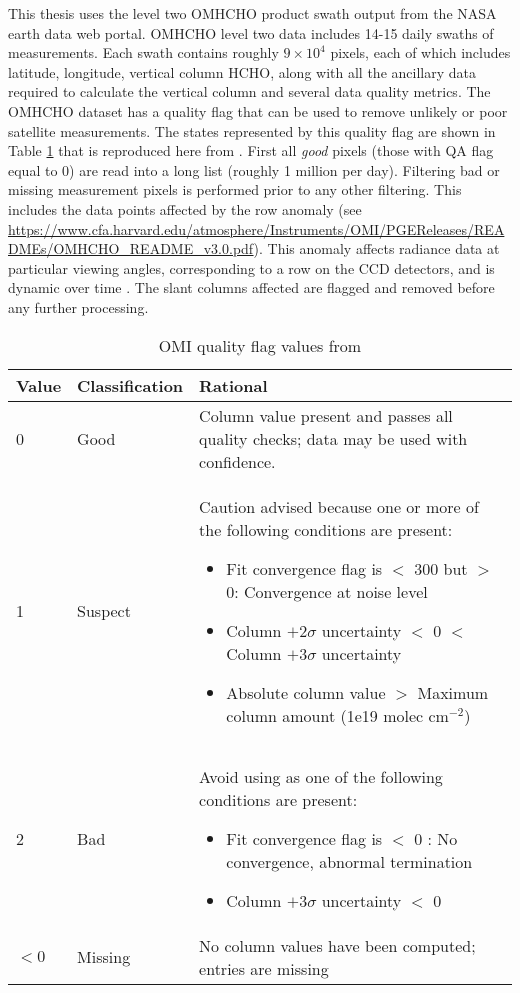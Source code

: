     This thesis uses the level two OMHCHO product swath output from the NASA earth data web portal.
    OMHCHO level two data includes 14-15 daily swaths of measurements.
    Each swath contains roughly $9 \times 10^4$ pixels, each of which includes latitude, longitude, vertical column HCHO, along with all the ancillary data required to calculate the vertical column and several data quality metrics.
    The OMHCHO dataset has a quality flag that can be used to remove unlikely or poor satellite measurements.
    The states represented by this quality flag are shown in Table \ref{Model:datasets:OMHCHO:tab_qflag} that is reproduced here from \textcite{Kurosu2014}.
    First all \textit{good} pixels (those with QA flag equal to 0) are read into a long list (roughly 1 million per day).
    Filtering bad or missing measurement pixels is performed prior to any other filtering.
    This includes the data points affected by the row anomaly (see \url{https://www.cfa.harvard.edu/atmosphere/Instruments/OMI/PGEReleases/READMEs/OMHCHO_README_v3.0.pdf}).
    This anomaly affects radiance data at particular viewing angles, corresponding to a row on the CCD detectors, and is dynamic over time \parencite{Huang2018}.
    The slant columns affected are flagged and removed before any further processing.
    
    \begin{table}
      \caption{OMI quality flag values from \textcite{Kurosu2014}}
      \begin{tabular}{  l  l  p{10cm} }
        \hline
        \textbf{Value} & \textbf{Classification} & \textbf{Rational} 
        \\ \hline
        0 & Good & Column value present and passes all quality checks; data may be used with confidence. 
        \\ \hline
        1 & Suspect & Caution advised because one or more of the following conditions are present: 
        \begin{itemize}
          \item Fit convergence flag is $<$ 300 but $>$ 0: Convergence at noise level
          \item Column $+ 2 \sigma$ uncertainty $<$ 0 $<$ Column $ + 3 \sigma $ uncertainty
          \item Absolute column value $>$ Maximum column amount (1e19 molec cm$^{-2}$)
        \end{itemize}
        \\ \hline
        2 & Bad & Avoid using as one of the following conditions are present: 
        \begin{itemize}
          \item Fit convergence flag is $<$ 0 : No convergence, abnormal termination
          \item Column $+ 3 \sigma$ uncertainty $<$ 0
        \end{itemize}
        \\ \hline
        $<0$ & Missing & No column values have been computed; entries are missing
        \\ \hline
      \end{tabular}
      \label{Model:datasets:OMHCHO:tab_qflag}
    \end{table}
    
